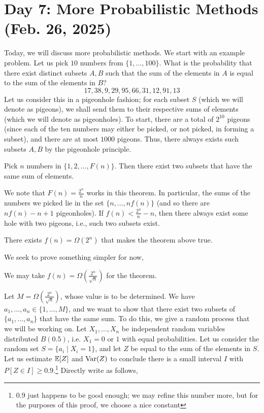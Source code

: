 \section{Day 7: More Probabilistic Methods (Feb. 26, 2025)}
Today, we will discuss more probabilistic methods. We start with an example problem. Let us pick $10$ numbers from $\{1, \dots, 100\}$. What is the probability that there exist distinct subsets $A, B$ such that the sum of the elements in $A$ is equal to the sum of the elements in $B$?
\[ 17, 38, 9, 29, 95, 66, 31, 12, 91, 13 \tag{Example Set} \]
Let us consider this in a pigeonhole fashion; for each subset $S$ (which we will denote as pigeons), we shall send them to their respective sums of elements (which we will denote as pigeonholes). To start, there are a total of $2^{10}$ pigeons (since each of the ten numbers may either be picked, or not picked, in forming a subset), and there are at most $1000$ pigeons. Thus, there always exists such subsets $A, B$ by the pigeonhole principle.
\begin{simplethm}
    Pick $n$ numbers in $\{1, 2, \dots, F(n)\}$. Then there exist two subsets that have the same sum of elements.
\end{simplethm}
\noindent We note that $F(n) = \frac{2^n}{n}$ works in this theorem. In particular, the sums of the numbers we picked lie in the set $\{n, \dots, nf(n)\}$ (and so there are $nf(n) - n + 1$ pigeonholes). If $f(n) < \frac{2^n}{n} - n$, then there always exist some hole with two pigeons, i.e., such two subsets exist.%
\begin{conjecture}
    There exists $f(n) = \Omega(2^n)$ that makes the theorem above true.
\end{conjecture}
\noindent We seek to prove something simpler for now,
\begin{simplethm}
    We may take $f(n) = \Omega(\frac{2^n}{\sqrt{n}})$ for the theorem.
\end{simplethm}
\noindent Let $M = \Omega(\frac{2^n}{\sqrt{n}})$, whose value is to be determined. We have $a_1, \dots, a_n \in \{1, \dots, M\}$, and we want to show that there exist two subsets of $\{a_1, \dots, a_n\}$ that have the same sum.
\medskip\newline
To do this, we give a random process that we will be working on. Let $X_1, \dots, X_n$ be independent random variables distributed $B(0.5)$, i.e. $X_1 = 0$ or $1$ with equal probabilities. Let us consider the random set $S = \{a_i \mid X_i = 1\}$, and let $Z$ be equal to the sum of the elements in $S$. Let us estimate $\mathbb E[Z]$ and $\operatorname{Var}(Z)$ to conclude there is a small interval $I$ with $P[Z \in I] \geq 0.9$.\footnote{$0.9$ just happens to be good enough; we may refine this number more, but for the purposes of this proof, we choose a nice constant} Directly write as follows,
